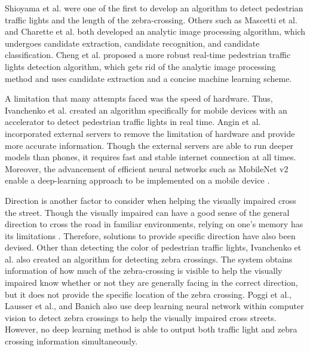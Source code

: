 \documentclass[runningheads]{llncs}
\begin{document}
Shioyama et al. \cite{11} were one of the first to develop an algorithm to detect pedestrian traffic lights and the length of the zebra-crossing. Others such as Mascetti et al. and Charette et al. \cite{3,15} both developed an analytic image processing algorithm, which undergoes candidate extraction, candidate recognition, and candidate classification. Cheng et al. \cite{5} proposed a more robust real-time pedestrian traffic lights detection algorithm, which gets rid of the analytic image processing method and uses candidate extraction and a concise machine learning scheme. 

A limitation that many attempts faced was the speed of hardware. Thus, Ivanchenko et al. \cite{12} created an algorithm specifically for mobile devices with an accelerator to detect pedestrian traffic lights in real time. Angin et al. \cite{13}  incorporated external servers to remove the limitation of hardware and provide more accurate information. Though the external servers are able to run deeper models than phones, it requires fast and stable internet connection at all times. Moreover, the advancement of efficient neural networks such as MobileNet v2 enable a deep-learning approach to be implemented on a mobile device \cite{14}.  

Direction is another factor to consider when helping the visually impaired cross the street. Though the visually impaired can have a good sense of the general direction to cross the road in familiar environments, relying on one's memory has its limitations \cite{16}. Therefore, solutions to provide specific direction have also been devised. Other than detecting the color of pedestrian traffic lights, Ivanchenko et al. \cite{16} also created an algorithm for detecting zebra crossings. The system obtains information of how much of the zebra-crossing is visible to help the visually impaired know whether or not they are generally facing in the correct direction, but it does not provide the specific location of the zebra crossing. Poggi et al., Lausser et al., and Banich \cite{17,18,19} also use deep learning neural network within computer vision to detect zebra crossings to help the visually impaired cross streets. However, no deep learning method is able to output both traffic light and zebra crossing information simultaneously. 
\end{document}
